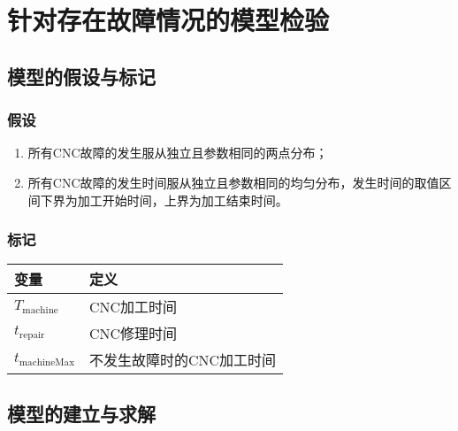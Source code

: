 \section{针对存在故障情况的模型检验}
	\subsection{模型的假设与标记}
		\subsubsection{假设}
			\begin{enumerate}
				\item\label{故障发生概率}所有CNC故障的发生服从独立且参数相同的两点分布；
				\item\label{故障发生时间}所有CNC故障的发生时间服从独立且参数相同的均匀分布，发生时间的取值区间下界为加工开始时间，上界为加工结束时间。
			\end{enumerate}
		\subsubsection{标记}
			\begin{table}[htbp]
				\centering
				\caption{标记：针对存在故障情况的模型检验}
				\label{标记：针对存在故障情况的模型检验}
				\begin{longtabu}to
					\toprule
					变量&定义\\\midrule
					\(T_\mathrm{machine}\)&CNC加工时间\\
					\(t_\mathrm{repair}\)&CNC修理时间\\
					\(t_\mathrm{machineMax}\)&不发生故障时的CNC加工时间\\\bottomrule
				\end{longtabu}
			\end{table}
	\subsection{模型的建立与求解}
